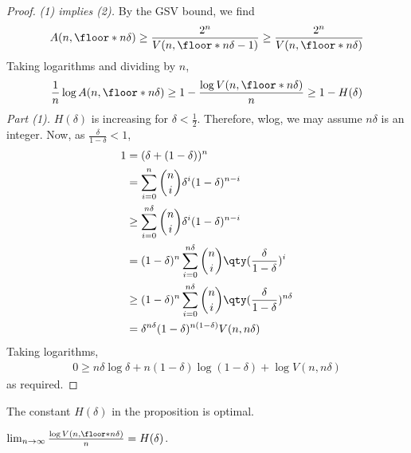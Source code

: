 \begin{proof}
    \emph{(1) implies (2).}
    By the GSV bound, we find
    \begin{align*}
        A(n,\floor*{n\delta}) \geq \frac{2^n}{V(n,\floor*{n\delta} - 1)} \geq \frac{2^n}{V(n,\floor*{n\delta})}
    \end{align*}
    Taking logarithms and dividing by $n$,
    \begin{align*}
        \frac{1}{n}\log A(n,\floor*{n\delta}) \geq 1 - \frac{\log V(n,\floor*{n\delta})}{n} \geq 1 - H(\delta)
    \end{align*}
    \emph{Part (1).}
    $H(\delta)$ is increasing for $\delta < \frac{1}{2}$.
    Therefore, wlog, we may assume $n\delta$ is an integer.
    Now, as $\frac{\delta}{1-\delta} < 1$,
    \begin{align*}
        1 &= (\delta + (1-\delta))^n \\
        &= \sum_{i=0}^n \binom{n}{i} \delta^i (1-\delta)^{n-i} \\
        &\geq \sum_{i=0}^{n\delta} \binom{n}{i} \delta^i (1-\delta)^{n-i} \\
        &= (1-\delta)^n \sum_{i=0}^{n\delta} \binom{n}{i} \qty(\frac{\delta}{1-\delta})^i \\
        &\geq (1-\delta)^n \sum_{i=0}^{n\delta} \binom{n}{i} \qty(\frac{\delta}{1-\delta})^{n\delta} \\
        &= \delta^{n\delta} (1-\delta)^{n(1-\delta)} V(n,n\delta)
    \end{align*}
    Taking logarithms,
    \begin{align*}
        0 \geq n\delta \log \delta + n(1-\delta) \log(1-\delta) + \log V(n,n\delta)
    \end{align*}
    as required.
\end{proof}

The constant $H(\delta)$ in the proposition is optimal.

\begin{lemma}
    $\lim_{n \to \infty} \frac{\log V(n,\floor*{n\delta})}{n} = H(\delta)$.
\end{lemma}

